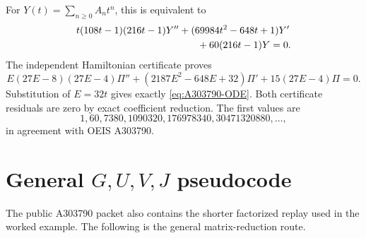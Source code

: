 \documentclass[11pt]{article}
\begin{document}
For $Y(t)=\sum_{n\ge0}A_nt^n$, this is equivalent to
\begin{equation}\label{eq:A303790-ODE}
\begin{aligned}
  &t(108t-1)(216t-1)Y''
  +(69984t^2-648t+1)Y'\\
  &\hspace{43mm}+60(216t-1)Y=0.
\end{aligned}
\end{equation}
The independent Hamiltonian certificate proves
\[
  E(27E-8)(27E-4)\Pi''
  +(2187E^2-648E+32)\Pi'
  +15(27E-4)\Pi=0.
\]
Substitution of $E=32t$ gives exactly \eqref{eq:A303790-ODE}.  Both certificate
residuals are zero by exact coefficient reduction.  The first values are
\[
  1,60,7380,1090320,176978340,30471320880,\ldots,
\]
in agreement with OEIS A303790.

\clearpage
\section{General $G,U,V,J$ pseudocode}

The public A303790 packet also contains the shorter factorized replay used in
the worked example.  The following is the general matrix-reduction route.
\end{document}

